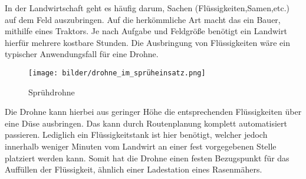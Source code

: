 In der Landwirtschaft geht es häufig darum, Sachen (Flüssigkeiten,Samen,etc.) auf dem Feld auszubringen. Auf die herkömmliche Art macht das ein Bauer, mithilfe eines Traktors. Je nach Aufgabe und Feldgröße benötigt ein Landwirt hierfür mehrere kostbare Stunden. Die Ausbringung von Flüssigkeiten wäre ein typischer Anwendungsfall für eine Drohne.

\begin{figure}[ht]
	\centering
	\texttt{[image: bilder/drohne\_im\_sprüheinsatz.png]}
	\caption[Sprühdrohne]{Sprühdrohne}
	\label{fig:sprühdrohne}
\end{figure}

Die Drohne kann hierbei aus geringer Höhe die entsprechenden Flüssigkeiten über eine Düse ausbringen. Das kann durch Routenplanung komplett automatisiert passieren. Lediglich ein Flüssigkeitstank ist hier benötigt, welcher jedoch innerhalb weniger Minuten vom Landwirt an einer fest vorgegebenen Stelle platziert werden kann. Somit hat die Drohne einen festen Bezugspunkt für das Auffüllen der Flüssigkeit, ähnlich einer Ladestation eines Rasenmähers.
